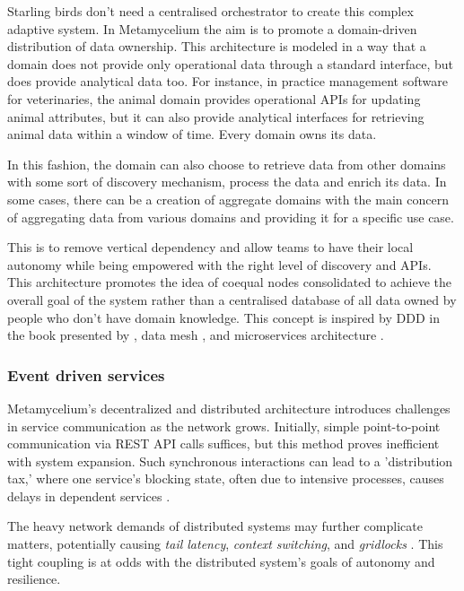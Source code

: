 \documentclass[preprint,12pt]{elsarticle}
\begin{document}
Starling birds don't need a centralised orchestrator to create this complex adaptive system. In Metamycelium the aim is to promote a domain-driven distribution of data ownership. This architecture is modeled in a way that a domain does not provide only operational data through a standard interface, but does provide analytical data too. For instance, in practice management software for veterinaries, the animal domain provides operational APIs for updating animal attributes, but it can also provide analytical interfaces for retrieving animal data within a window of time. Every domain owns its data.

In this fashion, the domain can also choose to retrieve data from other domains with some sort of discovery mechanism, process the data and enrich its data. In some cases, there can be a creation of aggregate domains with the main concern of aggregating data from various domains and providing it for a specific use case. 

This is to remove vertical dependency and allow teams to have their local autonomy while being empowered with the right level of discovery and APIs. This architecture promotes the idea of coequal nodes consolidated to achieve the overall goal of the system rather than a centralised database of all data owned by people who don't have domain knowledge. This concept is inspired by DDD in the book presented by \citeauthor{evans2004domain}, data mesh \cite{dehghani2020datamesh}, and microservices architecture \cite{newman2015building}.

\subsubsection{Event driven services}

Metamycelium's decentralized and distributed architecture introduces challenges in service communication as the network grows. Initially, simple point-to-point communication via REST API calls suffices, but this method proves inefficient with system expansion. Such synchronous interactions can lead to a 'distribution tax,' where one service's blocking state, often due to intensive processes, causes delays in dependent services \cite{montesi2016circuit}.

The heavy network demands of distributed systems may further complicate matters, potentially causing \emph{tail latency}, \emph{context switching}, and \emph{gridlocks} \cite{sriraman2018mu,gan2019open,kakivaya2018service,AtaeiApsec}. This tight coupling is at odds with the distributed system's goals of autonomy and resilience.
\end{document}
